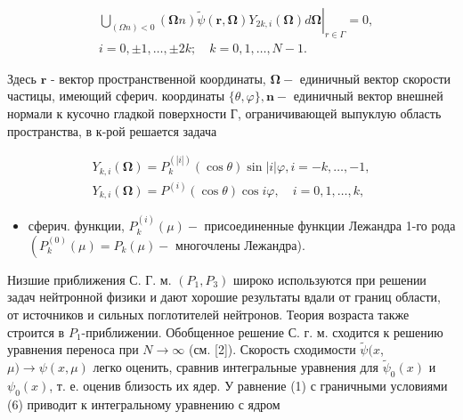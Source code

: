 \documentclass[10pt]{article}
\begin{document}
\[

\begin{aligned}

& \left.\bigcup_{(\Omega n)<0}(\boldsymbol{\Omega} n) \tilde{\psi}(\boldsymbol{r}, \boldsymbol{\Omega}) Y_{2 k, i}(\boldsymbol{\Omega}) d \boldsymbol{\Omega}\right|_{r \in \Gamma}=0, \\

& i=0, \pm 1, \ldots, \pm 2 k ; \quad k=0,1, \ldots, N-1 .

\end{aligned}

\]



Здесь $\boldsymbol{r}$ - вектор пространственной координаты, $\boldsymbol{\Omega}-$ единичный вектор скорости частицы, имеющий сферич. координаты $\{\theta, \varphi\}, \boldsymbol{n}-$ единичный вектор внешней нормали к кусочно гладкой поверхности $Г$, ограничивающей выпуклую область пространства, в к-рой решается задача



\[

\begin{gathered}

Y_{k, i}(\boldsymbol{\Omega})=P_{k}^{(|i|)}(\cos \theta) \sin |i| \varphi, i=-k, \ldots,-1, \\

Y_{k, i}(\mathbf{\Omega})=P^{(i)}(\cos \theta) \cos i \varphi, \quad i=0,1, \ldots, k,

\end{gathered}

\]



\begin{itemize}

  \item сферич. функции, $P_{k}^{(i)}(\mu)-$ присоединенные функции Лежандра 1-го рода $\left(P_{k}^{(0)}(\mu)=P_{k}(\mu)-\right.$ многочлены Лежандра).

\end{itemize}



Низшие приближения С. Г. м. $\left(P_{1}, P_{3}\right)$ широко используются при решении задач нейтронной физики и дают хорошие результаты вдали от границ области, от источников и сильных поглотителей нейтронов. Теория возраста также строится в $P_{1}$-приближении. Обобщенное решение С. г. м. сходится к решению уравнения переноса при $N \rightarrow \infty$ (см. [2]). Скорость сходимости $\tilde{\psi}(x$, $\mu) \rightarrow \psi(x, \mu)$ легко оценить, сравнив интегральные уравнения для $\tilde{\psi}_{0}(x)$ и $\psi_{0}(x)$, т. е. оценив близость их ядер. $У$ равнение (1) с граничными условиями (6) приводит к интегральному уравнению с ядром
\end{document}
